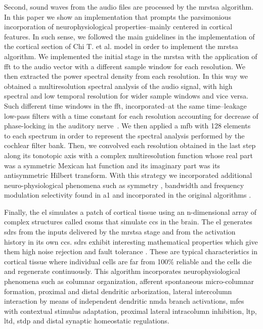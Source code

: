 {Second, sound waves from the audio files are processed by the \gls{mrstsa} algorithm. In this paper we show an implementation that prompts the parsimonious incorporation of neurophysiological properties--mainly centered in cortical features. In such sense, we followed the main guidelines in the implementation of the cortical section of Chi T. et al. \cite{chi_2005} model in order to implement the \gls{mrstsa} algorithm. We implemented the initial stage in the \gls{mrstsa} with the application of \gls{fft} to the audio vector with a different sample window for each resolution. We then extracted the power spectral density from each resolution. In this way we obtained a multiresolution spectral analysis of the audio signal, with high spectral and low temporal resolution for wider sample windows and vice versa. Such different time windows in the \gls{fft}, incorporated--at the same time--leakage low-pass filters with a time constant for each resolution accounting for decrease of phase-locking in the auditory nerve~\cite{chi_2005}. We then applied a \gls{mfb} with 128 elements to each spectrum in order to represent the spectral analysis performed by the cochlear filter bank. Then, we convolved each resolution obtained in the last step along its tonotopic axis with a complex multiresolution function whose real part was a symmetric Mexican hat function and its imaginary part was its antisymmetric Hilbert transform. With this strategy we incorporated additional neuro-physiological phenomena such as symmetry \cite{shamma_1993}, bandwidth \cite{schreiner_1990} and frequency modulation selectivity \cite{shamma_1993,heil_1992,mendelson_1985} found in \gls{a1} and incorporated in the original algorithms \cite{wang_1995}.

Finally, the \gls{el} simulates a patch of cortical tissue using an n-dimensional array of complex structures called \glspl{csom} that simulate \glspl{cc} in the brain. The \gls{el} generates \glspl{sdr} \cite{ahmad_2016} from the inputs delivered by the \gls{mrstsa} stage and from the activation history in its own \glspl{cc}. \glspl{sdr} exhibit interesting mathematical properties which give them high noise rejection and fault tolerance \cite{DBLP:journals/corr/AhmadH15}. These are typical characteristics in cortical tissue where individual cells are far from 100\% reliable and the cells die and regenerate continuously. This algorithm incorporates neurophysiological phenomena such as columnar organization, afferent spontaneous micro-columnar formation, proximal and distal dendritic arborization, lateral intercolumn interaction by means of independent dendritic \gls{nmda} branch activations, \glspl{mfe} with contextual stimulus adaptation, proximal lateral intracolumn inhibition, \gls{ltp}, \gls{ltd}, \gls{stdp} and distal synaptic homeostatic regulations.

}
